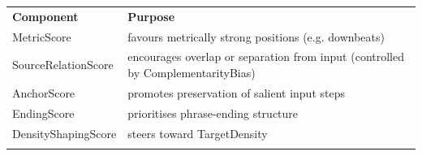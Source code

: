 {\def\LTcaptype{none} %
\begin{longtable}[]{@{}
  >{\raggedright\arraybackslash}p{}
  >{\raggedright\arraybackslash}p{}@{}}
\toprule\noalign{}
\begin{minipage}[b]{\linewidth}\centering
\textbf{Component}
\end{minipage} & \begin{minipage}[b]{\linewidth}\centering
\textbf{Purpose}
\end{minipage} \\
\begin{minipage}[b]{\linewidth}\raggedright
MetricScore
\end{minipage} & \begin{minipage}[b]{\linewidth}\raggedright
favours metrically strong positions (e.g. downbeats)
\end{minipage} \\
\begin{minipage}[b]{\linewidth}\raggedright
SourceRelationScore
\end{minipage} & \begin{minipage}[b]{\linewidth}\raggedright
encourages overlap or separation from input (controlled by
ComplementarityBias)
\end{minipage} \\
\begin{minipage}[b]{\linewidth}\raggedright
AnchorScore
\end{minipage} & \begin{minipage}[b]{\linewidth}\raggedright
promotes preservation of salient input steps
\end{minipage} \\
\begin{minipage}[b]{\linewidth}\raggedright
EndingScore
\end{minipage} & \begin{minipage}[b]{\linewidth}\raggedright
prioritises phrase-ending structure
\end{minipage} \\
\begin{minipage}[b]{\linewidth}\raggedright
DensityShapingScore
\end{minipage} & \begin{minipage}[b]{\linewidth}\raggedright
steers toward TargetDensity
\end{minipage} \\
\begin{minipage}[b]{\linewidth}\raggedright

\end{minipage}
\end{longtable}}
